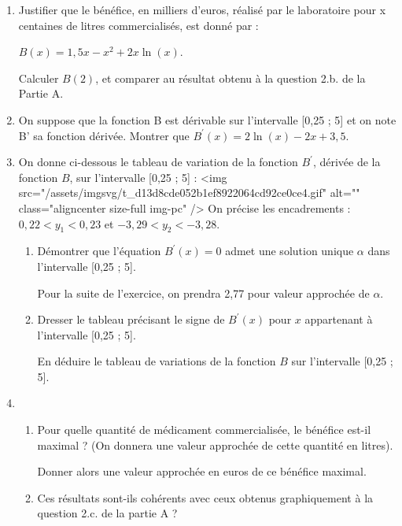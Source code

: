 \begin{enumerate}
     \item
     Justifier que le bénéfice, en milliers d'euros, réalisé par le laboratoire pour x centaines de litres commercialisés, est donné par :
     \par
     $B\left(x\right)=1,5x-x^{2}+2x \ln \left(x\right)$.
     \par
     Calculer $B\left(2\right)$, et comparer au résultat obtenu à la question 2.b. de la Partie A.
     \item
     On suppose que la fonction B est dérivable sur l'intervalle [0,25 ; 5] et on note B' sa fonction dérivée. Montrer que $B^{\prime}\left(x\right)=2\ln \left(x\right)-2x+3,5$.
     \item
     On donne ci-dessous le tableau de variation de la fonction $B^{\prime}$, dérivée de la fonction $B$, sur l'intervalle [0,25 ; 5] :
     <img src="/assets/imgsvg/t_d13d8cde052b1ef8922064cd92ce0ce4.gif" alt="" class="aligncenter size-full  img-pc" />
     On précise les encadrements : $0,22 < y_{1} < 0,23$ et $-3,29 < y_{2}  < -3,28$.
     \begin{enumerate}[label=\alph*.] 
          \item
          Démontrer que l'équation $B^{\prime}\left(x\right)=0$ admet une solution unique $\alpha $ dans l'intervalle [0,25 ; 5].
          \par
          Pour la suite de l'exercice, on prendra 2,77 pour valeur approchée de $\alpha $.
          \item
          Dresser le tableau précisant le signe de $B^{\prime}\left(x\right)$ pour $x$ appartenant à l'intervalle [0,25 ; 5].
          \par
          En déduire le tableau de variations de la fonction $B$ sur l'intervalle [0,25 ; 5].
     \end{enumerate}
     \item
     \begin{enumerate}[label=\alph*.] 
          \item
          Pour quelle quantité de médicament commercialisée, le bénéfice est-il maximal ? (On donnera une valeur approchée de cette quantité en litres).
          \par
          Donner alors une valeur approchée en euros de ce bénéfice maximal.
          \item
          Ces résultats sont-ils cohérents avec ceux obtenus graphiquement à la question 2.c. de la partie A ?
     \end{enumerate}
\end{enumerate}
